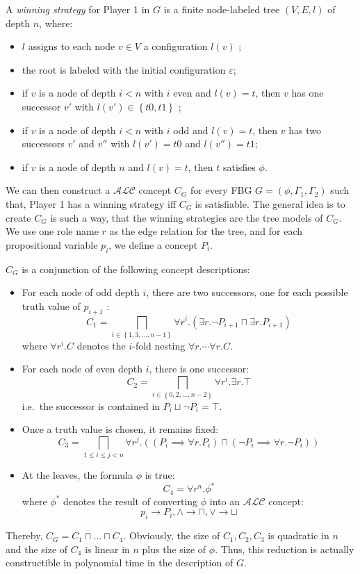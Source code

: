 A \textit{winning strategy} for Player 1 in $G$ is a finite node-labeled tree $\left( V, E ,l \right)$ of depth $n$, where:
 \begin{itemize}
	 \item $l$ assigns to each node $v \in V$ a configuration $l(v)$ ;
	 \item the root is labeled with the initial configuration $\varepsilon$;
	 \item if $v$ is a node of depth $i < n$ with $i$ even and $l(v) = t$,
		 then $v$ has one successor $v'$ with $l(v')  \in \left\{ t0, t1 \right\}$ ;
	 \item if $v$ is a node of depth $i < n$ with $i$ odd and $l(v) = t$,
		 then $v$ has two successors $v'$ and $v''$ with $l(v') = t0$ and $l(v'') = t1$;
	 \item if $v$ is a node of depth $n$ and $l(v) = t$, then $t$ satisfies $\phi$.
\end{itemize}

We can then construct a $\mathcal{ALC}$ concept $C_G$ for every FBG $G = \left( \phi, \Gamma_1, \Gamma_2 \right)$ such that,
Player 1 has a winning strategy iff $C_G$ is satisfiable.
The general idea is to create $C_G$ is such a way, that the winning strategies are the tree models of $C_G$.
We use one role name $r$ as the edge relation for the tree, and for each propositional variable $p_i$, we define a concept $P_i$.

$C_G$ is a conjunction of the following concept descriptions:
\begin{itemize}
	\item For each node of odd depth $i$, there are two successors, one for each possible truth value of $p_{i+1}$ :
		\[
			C_1 = \bigsqcap_{i \in \left\{ 1,3, \ldots, n-1 \right\}} \forall r^i.(\exists r. \neg P_{i+1} \sqcap \exists r.P_{i+1})
		\]
		where $\forall r^i.C$ denotes the $i$-fold nesting $\forall r. \cdots \forall r.C$.
	\item For each node of even depth $i$, there is one successor:
		\[
			C_2 = \bigsqcap_{i \in \left\{ 0, 2, \ldots, n-2 \right\}} \forall r^i.\exists r. \top
		\]
		i.e.\ the successor is contained in $P_i \sqcup \neg P_i = \top$.
	\item Once a truth value is chosen, it remains fixed:
		\[
			C_3 = \bigsqcap_{1 \leq i \leq j <n} \forall r^j. \left( (P_i \implies \forall r.P_i) \sqcap (\neg P_i \implies \forall r. \neg P_i) \right)
		\]
	\item At the leaves, the formula $\phi$ is true:
		\[
			C_4 = \forall r^n. \phi^*
		\]
		where $\phi^*$ denotes the result of converting $\phi$ into an $\mathcal{ALC}$ concept:
		\[
			p_i \to P_i, \land \to \sqcap, \lor \to \sqcup
		\]
\end{itemize}
Thereby, $C_G = C_1 \sqcap \ldots \sqcap C_4$.
Obviously, the size of $C_1, C_2, C_3$ is quadratic in $n$ and the size of $C_4$ is linear in  $n$ plus the size of $\phi$.
Thus, this reduction is actually constructible in polynomial time in the description of $G$.

